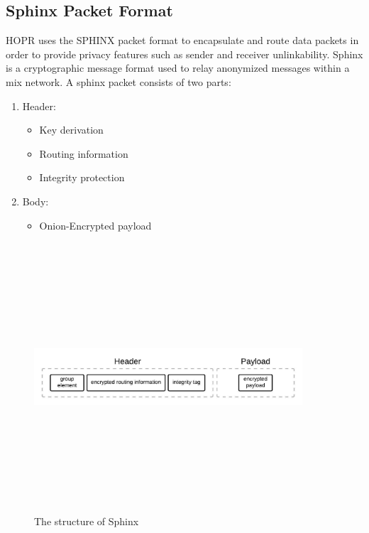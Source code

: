 \subsection{Sphinx Packet Format}

HOPR uses the SPHINX packet format to encapsulate and route data packets in order to provide privacy features such as sender and receiver unlinkability.
Sphinx is a cryptographic message format used to relay anonymized messages within a mix network. A sphinx packet consists of two parts:

\begin{enumerate}
\item Header:
\begin{itemize}
\item Key derivation
\item Routing information
\item Integrity protection
\end{itemize}
\item Body:
\begin{itemize}
\item Onion-Encrypted payload
\end{itemize}
\end{enumerate}

    \begin{figure}
        \centering
    \includegraphics[width=10cm,height=10cm,keepaspectratio]{../whitepaper/images/sphinx.jpeg}
    \caption{The structure of Sphinx}
    \label{fig:The structure of Sphinx}
    \end{figure}

